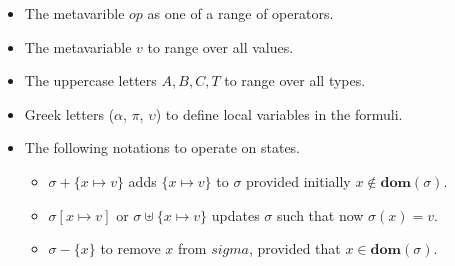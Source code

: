 \documentclass[a4paper,12pt]{report}
\begin{document}
\renewcommand\labelitemii{$\blacksquare$}
\begin{itemize}
  \item The metavarible $op$ as one of a range of operators. 
  \item The metavariable $v$ to range over all values.
  \item The uppercase letters $A,B,C,T$ to range over all types.
  \item Greek letters ($\alpha$, $\pi$, $\upsilon$) to define local variables in 
  the formuli. 
  \item The following notations to operate on states. 
    \begin{itemize}
      \item $\sigma + \{x \mapsto v\}$ adds $\{x \mapsto v\}$ to $\sigma$ provided initially $x \notin\textbf{dom}(\sigma)$. 
      \item $\sigma[x \mapsto v]$ or $\sigma \uplus \{x \mapsto v\}$ updates $\sigma$ such that now $\sigma(x) = v$.
      \item $\sigma - \{x\}$ to remove $x$ from $sigma$, provided that $x \in \textbf{dom}(\sigma)$.
    \end{itemize}
\end{itemize}
    
\end{document}
